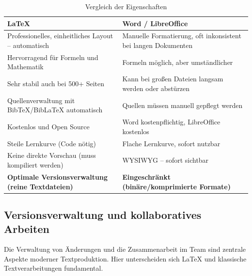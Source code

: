 \documentclass[a4paper,12pt]{article}
\begin{document}
	\begin{table}[h]
		\centering
		\caption{Vergleich der Eigenschaften}
		\label{tab:vergleich}
		\begin{tabular}{p{}p{}}
			\toprule
			\textbf{\LaTeX} & \textbf{Word / LibreOffice} \\
			\midrule
			Professionelles, einheitliches Layout – automatisch & Manuelle Formatierung, oft inkonsistent bei langen Dokumenten \\
			Hervorragend für Formeln und Mathematik & Formeln möglich, aber umständlicher \\
			Sehr stabil auch bei 500+ Seiten & Kann bei großen Dateien langsam werden oder abstürzen \\
			Quellenverwaltung mit BibTeX/BibLaTeX automatisch & Quellen müssen manuell gepflegt werden \\
			Kostenlos und Open Source & Word kostenpflichtig, LibreOffice kostenlos \\
			Steile Lernkurve (Code nötig) & Flache Lernkurve, sofort nutzbar \\
			Keine direkte Vorschau (muss kompiliert werden) & WYSIWYG – sofort sichtbar \\
			\textbf{Optimale Versionsverwaltung (reine Textdateien)} & \textbf{Eingeschränkt (binäre/komprimierte Formate)} \\
			\bottomrule
		\end{tabular}
	\end{table}
	
	\subsection{Versionsverwaltung und kollaboratives Arbeiten}
	\label{sec:versionsverwaltung}
	
	Die Verwaltung von Änderungen und die Zusammenarbeit im Team sind zentrale Aspekte moderner Textproduktion. Hier unterscheiden sich \LaTeX{} und klassische Textverarbeitungen fundamental.
	
\end{document}
